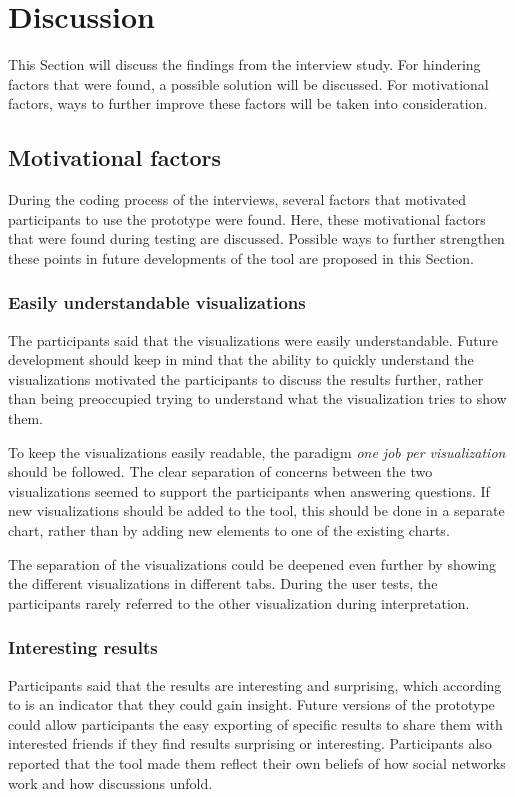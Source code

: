 \section{Discussion}
This Section will discuss the findings from the interview study. For hindering factors that were found, a possible solution will be discussed. For motivational factors, ways to further improve these factors will be taken into consideration.

\subsection{Motivational factors}
During the coding process of the interviews, several factors that motivated participants to use the prototype were found. Here, these motivational factors that were found during testing are discussed. Possible ways to further strengthen these points in future developments of the tool are proposed in this Section.

\subsubsection*{Easily understandable visualizations}
The participants said that the visualizations were easily understandable. Future development should keep in mind that the ability to quickly understand the visualizations motivated the participants to discuss the results further, rather than being preoccupied trying to understand what the visualization tries to show them.

To keep the visualizations easily readable, the paradigm \emph{one job per visualization} should be followed. The clear separation of concerns between the two visualizations seemed to support the participants when answering questions. If new visualizations should be added to the tool, this should be done in a separate chart, rather than by adding new elements to one of the existing charts.

The separation of the visualizations could be deepened even further by showing the different visualizations in different tabs. During the user tests, the participants rarely referred to the other visualization during interpretation.

\subsubsection*{Interesting results}
Participants said that the results are interesting and surprising, which according to \citeauthor{northMeasuringVisualizationInsight2006} is an indicator that they could gain insight. Future versions of the prototype could allow participants the easy exporting of specific results to share them with interested friends if they find results surprising or interesting. Participants also reported that the tool made them reflect their own beliefs of how social networks work and how discussions unfold.

